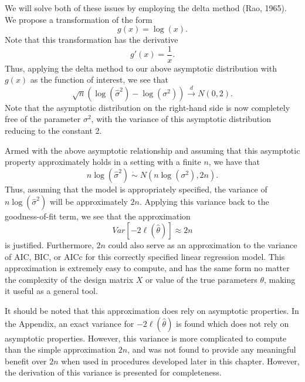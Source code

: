 		We will solve both of these issues by employing the delta method (Rao, 1965). We propose a transformation of the form
		\begin{equation*}
			g(x) = \log(x) .
		\end{equation*}
		Note that this transformation has the derivative
		\begin{equation*}
			g'(x) = \frac{1}{x} .
		\end{equation*}
		Thus, applying the delta method to our above asymptotic distribution with $g(x)$ as the function of interest, we see that
		\begin{equation*}
			\sqrt{n} ( \log (\hat{\sigma}^2) - \log(\sigma^2)) \xrightarrow[]{d} N(0, 2) .
		\end{equation*}
		Note that the asymptotic distribution on the right-hand side is now completely free of the parameter $\sigma^2$, with the variance of this asymptotic distribution reducing
		to the constant 2.

		Armed with the above asymptotic relationship and assuming that this asymptotic property approximately holds in a setting with a finite $n$, we have that
		\begin{equation*}
			n\log(\hat{\sigma}^2) \; \dot\sim \; N \left( n\log(\sigma^2), 2n \right) .
		\end{equation*}
		Thus, assuming that the model is appropriately specified, the variance of $n\log(\hat{\sigma}^2)$ will be approximately $2n$. Applying this variance back to the goodness-of-fit term,
		we see that the approximation
		\begin{equation*}
			Var \left[ -2 \ell (\hat{\theta}  ) \right] \approx 2n
		\end{equation*}
		is justified. Furthermore, $2n$ could also serve as an approximation to the variance of AIC, BIC, or AICc for this correctly specified linear regression model. This approximation
		is extremely easy to compute, and has the same form no matter the complexity of the design matrix $X$ or value of the true parameters $\theta$, making it useful as a
		general tool.

		It should be noted that this approximation does rely on asymptotic properties. In the Appendix, an exact variance for $-2 \ell (\hat{\theta})$ is found which does
		not rely on asymptotic properties. However, this variance is more complicated to compute than the simple approximation $2n$, and was not found to provide any meaningful
		benefit over $2n$ when used in procedures developed later in this chapter. However, the derivation of this variance is presented for completeness.
		
